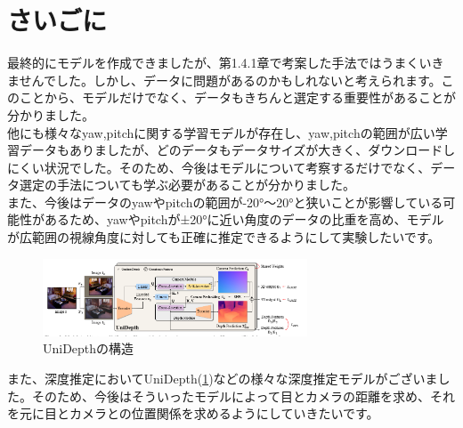 \section{さいごに}
最終的にモデルを作成できましたが、第1.4.1章で考案した手法ではうまくいきませんでした。しかし、データに問題があるのかもしれないと考えられます。このことから、モデルだけでなく、データもきちんと選定する重要性があることが分かりました。\\
他にも様々なyaw,pitchに関する学習モデルが存在し、yaw,pitchの範囲が広い学習データもありましたが、どのデータもデータサイズが大きく、ダウンロードしにくい状況でした。そのため、今後はモデルについて考察するだけでなく、データ選定の手法についても学ぶ必要があることが分かりました。\\
また、今後はデータのyawやpitchの範囲が-20°～20°と狭いことが影響している可能性があるため、yawやpitchが±20°に近い角度のデータの比重を高め、モデルが広範囲の視線角度に対しても正確に推定できるようにして実験したいです。\\
\begin{figure}[!ht]
    \centering
    \includegraphics[width=0.7\textwidth]{eye-track-cursor/fig/UniDepth.png}
    \caption{UniDepthの構造}
    \label{fig:UniDepth}
\end{figure}
また、深度推定においてUniDepth(\ref{fig:UniDepth})などの様々な深度推定モデルがございました。そのため、今後はそういったモデルによって目とカメラの距離を求め、それを元に目とカメラとの位置関係を求めるようにしていきたいです。
